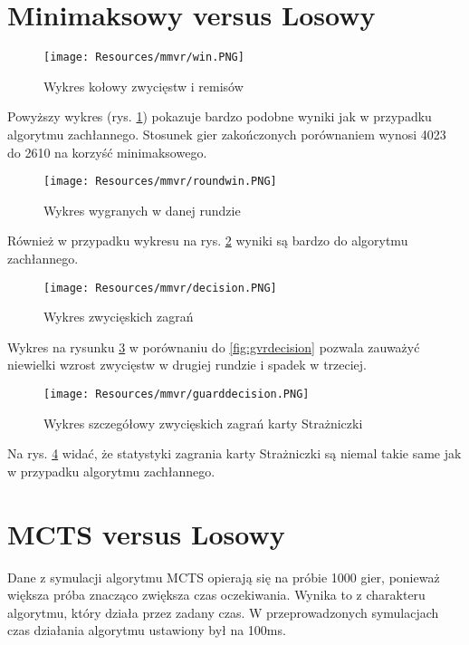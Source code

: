 \section{Minimaksowy versus Losowy}

\begin{figure}[H]
	\centering
	\texttt{[image: Resources/mmvr/win.PNG]}
	\caption{Wykres kołowy zwycięstw i remisów} 
	\label{fig:mmvrwin}
\end{figure}

Powyższy wykres (rys. \ref{fig:mmvrwin}) pokazuje bardzo podobne wyniki jak w przypadku algorytmu zachłannego. Stosunek gier zakończonych porównaniem wynosi 4023 do 2610 na korzyść minimaksowego.

\begin{figure}[H]
	\centering
	\texttt{[image: Resources/mmvr/roundwin.PNG]}
	\caption{Wykres wygranych w danej rundzie} 
	\label{fig:mmvrroundwin}
\end{figure}

Również w przypadku wykresu na rys. \ref{fig:mmvrroundwin} wyniki są bardzo do algorytmu zachłannego.

\begin{figure}[H]
	\centering
	\texttt{[image: Resources/mmvr/decision.PNG]}
	\caption{Wykres zwycięskich zagrań} 
	\label{fig:mmvrdecision}
\end{figure} 

Wykres na rysunku \ref{fig:mmvrdecision} w porównaniu do \ref{fig:gvrdecision} pozwala zauważyć niewielki wzrost zwycięstw w drugiej rundzie i spadek w trzeciej.

\begin{figure}[H]
	\centering
	\texttt{[image: Resources/mmvr/guarddecision.PNG]}
	\caption{Wykres szczegółowy zwycięskich zagrań karty Strażniczki} 
	\label{fig:mmvrguarddecision}
\end{figure}

Na rys. \ref{fig:mmvrguarddecision} widać, że statystyki zagrania karty Strażniczki są niemal takie same jak w przypadku algorytmu zachłannego.

\section{MCTS versus Losowy}

Dane z symulacji algorytmu MCTS opierają się na próbie 1000 gier, ponieważ większa próba znacząco zwiększa czas oczekiwania. Wynika to z charakteru algorytmu, który działa przez zadany czas. W przeprowadzonych symulacjach czas działania algorytmu ustawiony był na 100ms.

